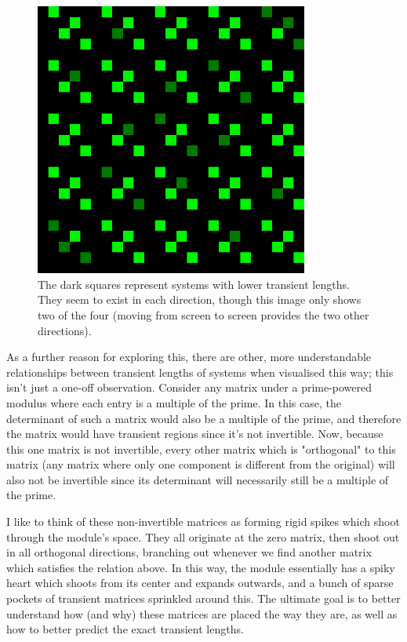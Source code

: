 \documentclass[a4paper, 12pt, reqno]{amsart}
\begin{document}
			\begin{figure}[h]
				\centering
				\includegraphics[height=9cm]{iterall_example.png}
				\caption{The dark squares represent systems with lower transient lengths. They seem to exist in each
				direction, though this image only shows two of the four (moving from screen to screen provides the two
				other directions).}
			\end{figure}
			
			As a further reason for exploring this, there are other, more understandable relationships between transient
			lengths of systems when visualised this way; this isn't just a one-off observation. Consider any matrix under 
			a prime-powered modulus where each entry is a multiple of the prime. In this case, the determinant of such a 
			matrix would also be a multiple of the prime, and therefore the matrix would have transient regions since it's 
			not invertible. Now, because this one matrix is not invertible, every other matrix which is "orthogonal" to this 
			matrix (any matrix where only one component is different from the original) will also not be invertible since its
			determinant will necessarily still be a multiple of the prime.
			
			I like to think of these non-invertible matrices as forming rigid spikes which shoot through the module's space.
			They all originate at the zero matrix, then shoot out in all orthogonal directions, branching out whenever we find
			another matrix which satisfies the relation above. In this way, the module essentially has a spiky heart which
			shoots from its center and expands outwards, and a bunch of sparse pockets of transient matrices sprinkled around
			this. The ultimate goal is to better understand how (and why) these matrices are placed the way they are, as well as
			how to better predict the exact transient lengths.
			
\end{document}
